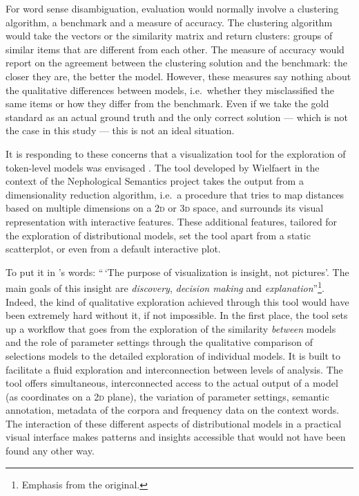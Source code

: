 \documentclass[
]{book}
\begin{document}
For word sense disambiguation, evaluation would normally involve a clustering algorithm, a benchmark and a measure of accuracy. The clustering algorithm would take the vectors or the similarity matrix and return clusters: groups of similar items that are different from each other. The measure of accuracy would report on the agreement between the clustering solution and the benchmark: the closer they are, the better the model. However, these measures say nothing about the qualitative differences between models, i.e.~whether they misclassified the same items or how they differ from the benchmark. Even if we take the gold standard as an actual ground truth and the only correct solution --- which is not the case in this study --- this is not an ideal situation.

It is responding to these concerns that a visualization tool for the exploration of token-level models was envisaged \autocite{wielfaert.etal_2019}. The tool developed by Wielfaert in the context of the Nephological Semantics project takes the output from a dimensionality reduction algorithm, i.e.~a procedure that tries to map distances based on multiple dimensions on a \textsc{2d} or \textsc{3d} space, and surrounds its visual representation with interactive features. These additional features, tailored for the exploration of distributional models, set the tool apart from a static scatterplot, or even from a default interactive plot.

To put it in \textcite[6]{card.etal_1999}'s words: ``\,`The purpose of visualization is insight, not pictures'. The main goals of this insight are \emph{discovery}, \emph{decision making} and \emph{explanation}''\footnote{Emphasis from the original.}. Indeed, the kind of qualitative exploration achieved through this tool would have been extremely hard without it, if not impossible.
In the first place, the tool sets up a workflow that goes from the exploration of the similarity \emph{between} models and the role of parameter settings through the qualitative comparison of selections models to the detailed exploration of individual models. It is built to facilitate a fluid exploration and interconnection between levels of analysis. The tool offers simultaneous, interconnected access to the actual output of a model (as coordinates on a \textsc{2d} plane), the variation of parameter settings, semantic annotation, metadata of the corpora and frequency data on the context words. The interaction of these different aspects of distributional models in a practical visual interface makes patterns and insights accessible that would not have been found any other way.
\end{document}

